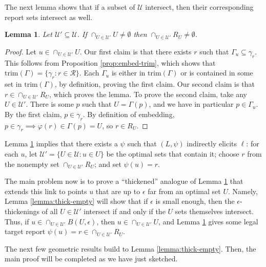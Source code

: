 \documentclass[11pt]{article}
\newcommand{\R}{\mathcal{R}}
\newcommand{\U}{\mathcal{U}}
\newcommand{\trim}{\mathrm{trim}}
\newtheorem{lemma}{Lemma}
\begin{document}
The next lemma shows that if a subset of $\U$ intersect, then their corresponding report sets intersect as well.
\begin{lemma} \label{lemma:calibrated-pos}
  Let $\U' \subseteq \U$.
  If $\cap_{U\in\U'} U \neq \emptyset$ then $\cap_{U\in\U'} R_U \neq \emptyset$.
\end{lemma}
\begin{proof}
  Let $u \in \cap_{U\in\U'} U$.
  Our first claim is that there exists $r$ such that $\Gamma_u \subseteq \gamma_r$.
  This follows from Proposition \ref{prop:embed-trim}, which shows that $\trim(\Gamma) = \{ \gamma_r : r \in \R\}$.
  Each $\Gamma_u$ is either in $\trim(\Gamma)$ or is contained in some set in $\trim(\Gamma)$, by definition, proving the first claim.
  Our second claim is that $r \in \cap_{U\in\U'} R_U$, which proves the lemma.
  To prove the second claim, take any $U \in \U'$.
  There is some $p$ such that $U = \Gamma(p)$, and we have in particular $p \in \Gamma_u$.
  By the first claim, $p \in \gamma_r$.
  By definition of embedding, $p \in \gamma_r \implies \varphi(r) \in \Gamma(p) = U$, so $r \in R_U$.
\end{proof}
Lemma \ref{lemma:calibrated-pos} implies that there exists a $\psi$ such that $(L,\psi)$ indirectly elicits $\ell$: for each $u$, let $\U' = \{U\in\U : u \in U\}$ be the optimal sets that contain it; choose $r$ from the nonempty set $\cap_{U \in\U'} R_U$; and set $\psi(u) = r$.

The main problem now is to prove a ``thickened'' analogue of Lemma \ref{lemma:calibrated-pos} that extends this link to points $u$ that are up to $\epsilon$ far from an optimal set $U$.
Namely, Lemma \ref{lemma:thick-empty} will show that if $\epsilon$ is small enough, then the $\epsilon$-thickenings of all $U \in \U'$ intersect if and only if the $U$ sets themselves intersect.
Thus, if $u \in \cap_{U \in \U'} B(U,\epsilon)$, then $u \in \cap_{U \in \U'} U$, and Lemma \ref{lemma:calibrated-pos} gives some legal target report $\psi(u) = r \in \cap_{U \in \U'} R_U$.

The next few geometric results build to Lemma \ref{lemma:thick-empty}.
Then, the main proof will be completed as we have just sketched.
\end{document}
